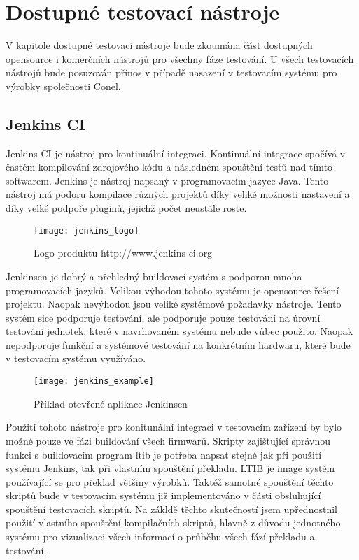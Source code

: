 \chapter{Dostupné testovací nástroje}
V kapitole dostupné testovací nástroje bude zkoumána část dostupných opensource i komerčních nástrojů pro všechny fáze testování. U všech testovacích nástrojů bude posuzován přínos v případě nasazení v testovacím systému pro výrobky společnosti Conel.

\section{Jenkins CI}
Jenkins CI je nástroj pro kontinuální integraci. Kontinuální integrace spočívá v častém kompilování zdrojového kódu a následném spouštění testů nad tímto softwarem.
Jenkins je nástroj napsaný v programovacím jazyce Java. Tento nástroj má podoru kompilace různých projektů díky veliké možnosti nastavení a díky velké podpoře pluginů, jejichž počet neustále roste.

\begin{figure}[h]
  \centering
  \texttt{[image: jenkins\_logo]}
  \caption{Logo produktu http://www.jenkins-ci.org}
  \label{fig:testlink_logo}
\end{figure}

Jenkinsen je dobrý a přehledný buildovací systém s podporou mnoha programovacích jazyků. Velikou výhodou tohoto systému je opensource řešení projektu. Naopak nevýhodou jsou veliké systémové požadavky nástroje. Tento systém sice podporuje testování, ale podporuje pouze testování na úrovní testování jednotek, které v navrhovaném systému nebude vůbec použito. Naopak nepodporuje funkční a systémové testování na konkrétním hardwaru, které bude v testovacím systému využíváno.

\begin{figure}[h]
  \centering
  \texttt{[image: jenkins\_example]}
  \caption{Příklad otevřené aplikace Jenkinsen}
  \label{fig:testlink_example}
\end{figure}

Použití tohoto nástroje pro konitunální integraci v testovacím zařízení by bylo možné pouze ve fázi buildování všech firmwarů. Skripty zajišťující správnou funkci s buildovacím program ltib je potřeba napsat stejné jak při použití systému Jenkins, tak při vlastním spouštění překladu. LTIB je image systém používající se pro překlad většiny výrobků. Taktéž samotné spouštění těchto skriptů bude v testovacím systému již implementováno v části obsluhující spouštění testovacích skriptů. Na zákldě těchto skutečností jsem upřednostnil použití vlastního spouštění kompilačních skriptů, hlavně z důvodu jednotného systému pro vizualizaci všech informací o průběhu všech fází překladu a testování.

